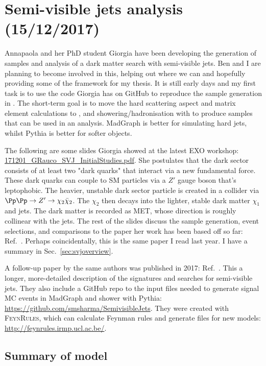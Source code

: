 
\chapter{Semi-visible jets analysis (15/12/2017)}

Annapaola and her PhD student Giorgia have been developing the generation of samples and analysis of a dark matter search with semi-visible jets. Ben and I are planning to become involved in this, helping out where we can and hopefully providing some of the framework for my thesis. It is still early days and my first task is to use the code Giorgia has on GitHub to reproduce the sample generation in \PYTHIA. The short-term goal is to move the hard scattering aspect and matrix element calculations to \madgraph, and showering/hadronisation with \PYTHIA to produce samples that can be used in an analysis. MadGraph is better for simulating hard jets, whilst Pythia is better for softer objects.

The following are some slides Giorgia showed at the latest EXO workshop: \href{run:modules/Sec 35 - Semi-visible jets analysis/figures/171201_GRauco_SVJ_InitialStudies.pdf}{171201\_GRauco\_SVJ\_InitialStudies.pdf}. She postulates that the dark sector consists of at least two "dark quarks" that interact via a new fundamental force. These dark quarks can couple to SM particles via a $Z'$ gauge boson that's leptophobic. The heavier, unstable dark sector particle is created in a collider via $\Pp\Pp \rightarrow Z' \rightarrow \chi_2 \bar{\chi}_2$. The $\chi_2$ then decays into the lighter, stable dark matter $\chi_1$ and jets. The dark matter is recorded as MET, whose direction is roughly collinear with the jets. The rest of the slides discuss the sample generation, event selections, and comparisons to the paper her work has been based off so far: Ref.~\cite{Cohen:2015toa}. Perhaps coincidentally, this is the same paper I read last year. I have a summary in Sec.~\ref{sec:svjoverview}.

A follow-up paper by the same authors was published in 2017: Ref.~\cite{Cohen:2017pzm}. This a longer, more-detailed description of the signatures and searches for semi-visible jets. They also include a GitHub repo to the input files needed to generate signal MC events in MadGraph and shower with Pythia: \url{https://github.com/smsharma/SemivisibleJets}. They were created with \textsc{FeynRules}, which can calculate Feynman rules and generate files for new models: \url{http://feynrules.irmp.ucl.ac.be/}.


\section{Summary of model}


